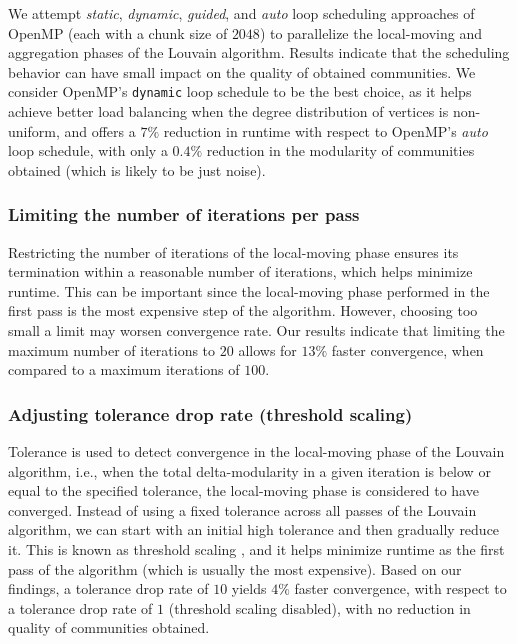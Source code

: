 We attempt \textit{static}, \textit{dynamic}, \textit{guided}, and \textit{auto} loop scheduling approaches of OpenMP (each with a chunk size of $2048$) to parallelize the local-moving and aggregation phases of the Louvain algorithm. Results indicate that the scheduling behavior can have small impact on the quality of obtained communities. We consider OpenMP's \verb|dynamic| loop schedule to be the best choice, as it helps achieve better load balancing when the degree distribution of vertices is non-uniform, and offers a $7\%$ reduction in runtime with respect to OpenMP's \textit{auto} loop schedule, with only a $0.4\%$ reduction in the modularity of communities obtained (which is likely to be just noise).

\subsubsection{Limiting the number of iterations per pass}

Restricting the number of iterations of the local-moving phase ensures its termination within a reasonable number of iterations, which helps minimize runtime. This can be important since the local-moving phase performed in the first pass is the most expensive step of the algorithm. However, choosing too small a limit may worsen convergence rate. Our results indicate that limiting the maximum number of iterations to $20$ allows for $13\%$ faster convergence, when compared to a maximum iterations of $100$.


\subsubsection{Adjusting tolerance drop rate (threshold scaling)}

Tolerance is used to detect convergence in the local-moving phase of the Louvain algorithm, i.e., when the total delta-modularity in a given iteration is below or equal to the specified tolerance, the local-moving phase is considered to have converged. Instead of using a fixed tolerance across all passes of the Louvain algorithm, we can start with an initial high tolerance and then gradually reduce it. This is known as threshold scaling \cite{com-lu15, com-naim17, com-halappanavar17}, and it helps minimize runtime as the first pass of the algorithm (which is usually the most expensive). Based on our findings, a tolerance drop rate of $10$ yields $4\%$ faster convergence, with respect to a tolerance drop rate of $1$ (threshold scaling disabled), with no reduction in quality of communities obtained.



